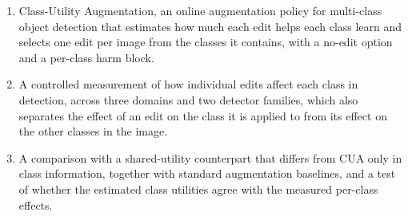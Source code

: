 \documentclass[conference]{IEEEtran}
\begin{document}
\begin{enumerate}
    \item Class-Utility Augmentation, an online augmentation policy for multi-class object detection that estimates how much each edit helps each class learn and selects one edit per image from the classes it contains, with a no-edit option and a per-class harm block.
    \item A controlled measurement of how individual edits affect each class in detection, across three domains and two detector families, which also separates the effect of an edit on the class it is applied to from its effect on the other classes in the image.
    \item A comparison with a shared-utility counterpart that differs from CUA only in class information, together with standard augmentation baselines, and a test of whether the estimated class utilities agree with the measured per-class effects.
\end{enumerate}
\end{document}
